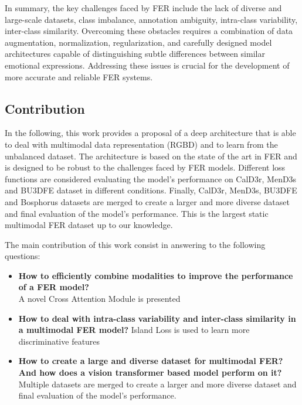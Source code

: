 In summary, the key challenges faced by FER include the lack of diverse and large-scale datasets, class imbalance, annotation ambiguity, intra-class variability, inter-class similarity. Overcoming these obstacles requires a combination of data augmentation, normalization, regularization, and carefully designed model architectures capable of distinguishing subtle differences between similar emotional expressions. Addressing these issues is crucial for the development of more accurate and reliable FER systems.\\


\subsection{Contribution}
In the following, this work provides a proposal of a deep architecture that is able to deal with multimodal data representation (RGBD) and to learn from the unbalanced dataset. The architecture is based on the state of the art in FER and is designed to be robust to the challenges faced by FER models. Different loss functions are considered evaluating the model's performance on CalD3r, MenD3s \cite{CalD3rMenD3s} and BU3DFE \cite{BU3DFE} dataset in different conditions. Finally, CalD3r, MenD3s\cite{CalD3rMenD3s}, BU3DFE \cite{BU3DFE} and Bosphorus \cite{Bosphorus} datasets are merged to create a larger and more diverse dataset and final evaluation of the model's performance. This is the largest static multimodal FER dataset up to our knowledge.

The main contribution of this work consist in answering to the following questions:
\begin{itemize}
    \item \textbf{How to efficiently combine modalities to improve the performance of a FER model?} \\
    A novel Cross Attention Module is presented
    \item \textbf{How to deal with intra-class variability and inter-class similarity in a multimodal FER model?} Island Loss is used to learn more discriminative features
    \item \textbf{How to create a large and diverse dataset for multimodal FER? And how does a vision transformer based model perform on it?} Multiple datasets are merged to create a larger and more diverse dataset and final evaluation of the model's performance.

\end{itemize}
    



